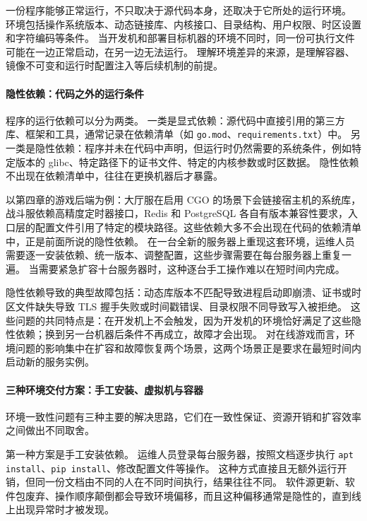 一份程序能够正常运行，不只取决于源代码本身，还取决于它所处的运行环境。
环境包括操作系统版本、动态链接库、内核接口、目录结构、用户权限、时区设置和字符编码等条件。
当开发机和部署目标机器的环境不同时，同一份可执行文件可能在一边正常启动，在另一边无法运行。
理解环境差异的来源，是理解容器、镜像不可变和运行时配置注入等后续机制的前提。

\paragraph{隐性依赖：代码之外的运行条件}

程序的运行依赖可以分为两类。
一类是显式依赖：源代码中直接引用的第三方库、框架和工具，通常记录在依赖清单（如 \texttt{go.mod}、\texttt{requirements.txt}）中。
另一类是隐性依赖：程序并未在代码中声明，但运行时仍然需要的系统条件，例如特定版本的 glibc、特定路径下的证书文件、特定的内核参数或时区数据。
隐性依赖不出现在依赖清单中，往往在更换机器后才暴露。

以第四章的游戏后端为例：大厅服在启用 CGO 的场景下会链接宿主机的系统库，战斗服依赖高精度定时器接口，Redis 和 PostgreSQL 各自有版本兼容性要求，入口层的配置文件引用了特定的模块路径。这些依赖大多不会出现在代码的依赖清单中，正是前面所说的隐性依赖。
在一台全新的服务器上重现这套环境，运维人员需要逐一安装依赖、统一版本、调整配置，这些步骤需要在每台服务器上重复一遍。
当需要紧急扩容十台服务器时，这种逐台手工操作难以在短时间内完成。

隐性依赖导致的典型故障包括：动态库版本不匹配导致进程启动即崩溃、证书或时区文件缺失导致 TLS 握手失败或时间戳错误、目录权限不同导致写入被拒绝。
这些问题的共同特点是：在开发机上不会触发，因为开发机的环境恰好满足了这些隐性依赖；换到另一台机器后条件不再成立，故障才会出现。
对在线游戏而言，环境问题的影响集中在扩容和故障恢复两个场景，这两个场景正是要求在最短时间内启动新的服务实例。

\paragraph{三种环境交付方案：手工安装、虚拟机与容器}

环境一致性问题有三种主要的解决思路，它们在一致性保证、资源开销和扩容效率之间做出不同取舍。

第一种方案是手工安装依赖。
运维人员登录每台服务器，按照文档逐步执行 \texttt{apt install}、\texttt{pip install}、修改配置文件等操作。
这种方式直接且无额外运行开销，但同一份文档由不同的人在不同时间执行，结果往往不同。
软件源更新、软件包废弃、操作顺序颠倒都会导致环境偏移，而且这种偏移通常是隐性的，直到线上出现异常时才被发现。

